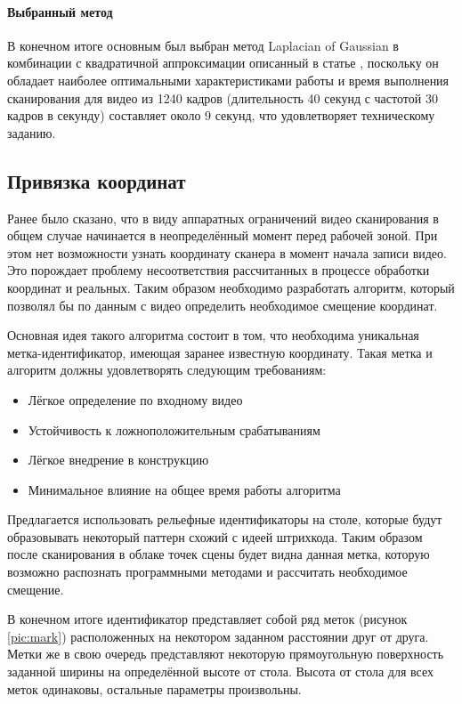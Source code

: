             \paragraph{Выбранный метод}
                В конечном итоге основным был выбран метод Laplacian of Gaussian в комбинации с квадратичной аппроксимации описанный в статье \cite{Molder2014}, поскольку он обладает наиболее оптимальными характеристиками работы и время выполнения сканирования для видео из 1240 кадров (длительность 40 секунд с частотой 30 кадров в секунду) составляет около 9 секунд, что удовлетворяет техническому заданию.
            
        \subsection{Привязка координат}
            Ранее было сказано, что в виду аппаратных ограничений видео сканирования в общем случае начинается в неопределённый момент перед рабочей зоной. При этом нет возможности узнать координату сканера в момент начала записи видео. Это порождает проблему несоответствия рассчитанных в процессе обработки координат и реальных. Таким образом необходимо разработать алгоритм, который позволял бы по данным с видео определить необходимое смещение координат.
            
            Основная идея такого алгоритма состоит в том, что необходима уникальная метка-идентификатор, имеющая заранее известную координату. Такая метка и алгоритм должны удовлетворять следующим требованиям:
            \begin{itemize}
                \item Лёгкое определение по входному видео
                \item Устойчивость к ложноположительным срабатываниям
                \item Лёгкое внедрение в конструкцию
                \item Минимальное влияние на общее время работы алгоритма
            \end{itemize}

            Предлагается использовать рельефные идентификаторы на столе, которые будут образовывать некоторый паттерн схожий с идеей штрихкода. Таким образом после сканирования в облаке точек сцены будет видна данная метка, которую возможно распознать программными методами и рассчитать необходимое смещение.
            
            В конечном итоге идентификатор представляет собой ряд меток (рисунок \ref{pic:mark}) расположенных на некотором заданном расстоянии друг от друга. Метки же в свою очередь представляют некоторую прямоугольную поверхность заданной ширины на определённой высоте от стола. Высота от стола для всех меток одинаковы, остальные параметры произвольны.
            
